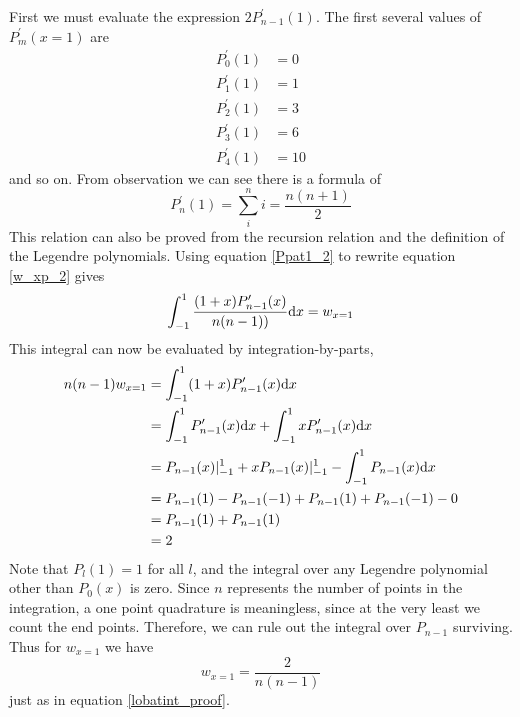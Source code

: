 First we must evaluate the expression $2P^\prime_{n-1}(1)$. The first several values
of $P^\prime_m(x=1)$ are
\begin{align}
\label{Ppat1}
P^\prime_0(1) &=0 \nonumber \\
P^\prime_1(1) &=1 \nonumber \\
P^\prime_2(1) &=3 \nonumber \\
P^\prime_3(1) &=6 \nonumber \\
P^\prime_4(1) &=10
\end{align}
and so on. From observation we can see there is a formula of 
\begin{equation}
\label{Ppat1_2}
P^\prime_n(1)=\sum_i^ni = \frac{n(n+1)}{2}
\end{equation}
This relation can also be proved from the recursion relation and the definition
of the Legendre polynomials. Using equation \ref{Ppat1_2} to rewrite equation 
\ref{w_xp_2} gives
\begin{equation}
\label{w_xp_3}
\int_{-1}^{1} \frac{(1+x)P^\prime_{n-1}(x)}{n(n-1))}{\rm d}x = w_{x=1}
\end{equation}
This integral can now be evaluated by integration-by-parts, 
\begin{align}
n(n-1)w_{x=1} &= \int_{-1}^{1} (1+x)P^\prime_{n-1}(x){\rm d}x \nonumber\\
&= \int_{-1}^{1} P^\prime_{n-1}(x){\rm d}x + \int_{-1}^{1} xP^\prime_{n-1}(x){\rm d}x \nonumber \\
&= P_{n-1}(x)\vert^1_{-1} + xP_{n-1}(x) \vert^1_{-1} - \int_{-1}^{1} P_{n-1}(x){\rm d}x \nonumber \\
&= P_{n-1}(1)-P_{n-1}(-1)+P_{n-1}(1)+P_{n-1}(-1) - 0 \nonumber \\
&= P_{n-1}(1)+P_{n-1}(1)\nonumber \\
\label{xp_int}
&=2
\end{align}
Note that $P_l(1)=1$ for all $l$, and the integral over any Legendre polynomial
other than $P_0(x)$ is zero. Since $n$ represents the number of points in the integration,
a one point quadrature is meaningless, since at the very least we count the end points.  
Therefore, we can rule out the integral over $P_{n-1}$ 
surviving. Thus for $w_{x=1}$ we have
\begin{equation}
w_{x=1}=\frac{2}{n(n-1)}
\end{equation}
just as in equation \ref{lobatint_proof}. 


